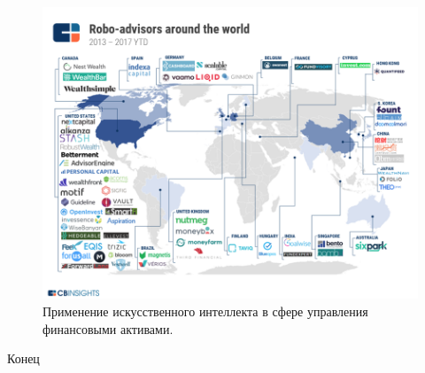 \documentclass[12pt]{beamer}
\begin{document}
\begin{frame}
\begin{figure}
\centering
\includegraphics[scale=.35]{img/AI_robo_advisors}
\caption{Применение искусственного интеллекта в сфере управления финансовыми активами.}
\end{figure}
\end{frame}

\begin{frame}
\begin{center}
	\huge{Конец}
\end{center}
\end{frame}
\end{document}
